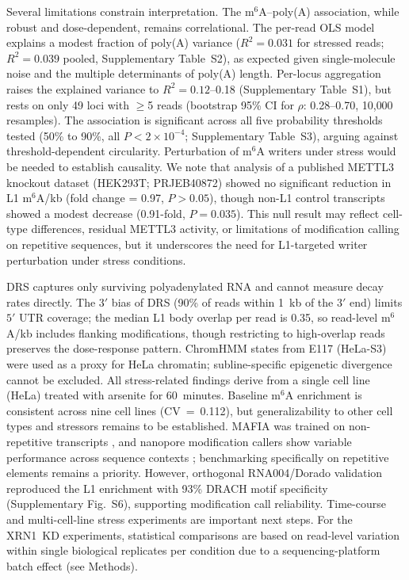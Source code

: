 \documentclass[11pt]{article}
\newcommand{\msix}{m$^6$A}
\begin{document}
Several limitations constrain interpretation. The \msix{}--poly(A)
association, while robust and dose-dependent, remains correlational.
The per-read OLS model explains a modest fraction of poly(A) variance
($R^2 = 0.031$ for stressed reads; $R^2 = 0.039$ pooled,
Supplementary Table~S2), as expected given single-molecule noise and
the multiple determinants of poly(A) length. Per-locus aggregation
raises the explained variance to $R^2 = 0.12$--0.18
(Supplementary Table~S1), but rests on only 49 loci with $\geq$5 reads
(bootstrap 95\% CI for $\rho$: 0.28--0.70, 10{,}000 resamples). The association is
significant across all five probability thresholds tested
(50\% to 90\%, all $P < 2 \times 10^{-4}$; Supplementary
Table~S3), arguing against threshold-dependent circularity.
Perturbation of \msix{} writers under stress would be needed to
establish causality. We note that analysis of a published METTL3
knockout dataset (HEK293T; PRJEB40872) showed no significant reduction
in L1 \msix{}/kb (fold change = 0.97, $P > 0.05$), though non-L1
control transcripts showed a modest decrease (0.91-fold, $P = 0.035$).
This null result may reflect cell-type differences, residual METTL3
activity, or limitations of modification calling on repetitive
sequences, but it underscores the need for L1-targeted writer
perturbation under stress conditions.

DRS captures only surviving polyadenylated RNA and
cannot measure decay rates directly. The $3'$ bias of DRS (90\% of reads
within 1~kb of the $3'$ end) limits $5'$ UTR coverage; the median L1 body
overlap per read is 0.35, so read-level \msix{}/kb includes flanking
modifications, though restricting to high-overlap reads preserves the
dose-response pattern. ChromHMM states from E117 (HeLa-S3) were used as a
proxy for HeLa chromatin; subline-specific epigenetic divergence cannot
be excluded. All stress-related findings derive from a single cell line
(HeLa) treated with arsenite for 60~minutes. Baseline \msix{} enrichment
is consistent across nine cell lines (CV~=~0.112), but generalizability
to other cell types and stressors remains to be established. MAFIA was
trained on non-repetitive transcripts \citep{Pratanwanich2021,Hendra2022},
and nanopore modification callers show variable performance across
sequence contexts \citep{Deng2024bench}; benchmarking specifically on
repetitive elements remains a priority. However, orthogonal RNA004/Dorado
validation reproduced the L1 enrichment with 93\% DRACH motif specificity
(Supplementary Fig.~S6), supporting modification call reliability. Time-course and
multi-cell-line stress experiments are important next steps. For the
XRN1~KD experiments, statistical comparisons are based on read-level
variation within single biological replicates per condition due to a
sequencing-platform batch effect (see Methods).
\end{document}
